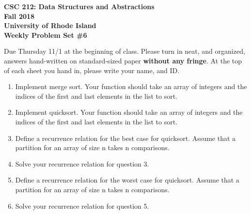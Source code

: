 \documentclass[11pt]{article}
\begin{document}
    \thispagestyle{empty}
    
    \begin{center}
        {\Large\bf CSC 212: Data Structures and Abstractions}\\
        \medskip
        {\Large\bf Fall 2018}\\
        \medskip
        {\Large\bf University of Rhode Island}\\
        \bigskip
        {\Large\bf Weekly Problem Set \#6}
    \end{center}
    
    Due Thursday 11/1 at the beginning of class. Please turn in neat, and organized, answers hand-written on standard-sized paper \textbf{without any fringe}. At the top of each sheet you hand in, please write your name, and ID.
    
    \begin{enumerate}
        \item Implement merge sort. Your function should take an array of integers and the indices of the first and last elements in the list to sort.
        \item Implement quicksort. Your function should take an array of integers and the indices of the first and last elements in the list to sort.
        \item Define a recurrence relation for the best case for quicksort. Assume that a partition for an array of size n takes n comparisons.
        \item Solve your recurrence relation for question 3.
        \item Define a recurrence relation for the worst case for quicksort. Assume that a partition for an array of size n takes n comparisons.
        \item Solve your recurrence relation for question 5.
    \end{enumerate}
    \label{r:lastpage}
    
\end{document}
